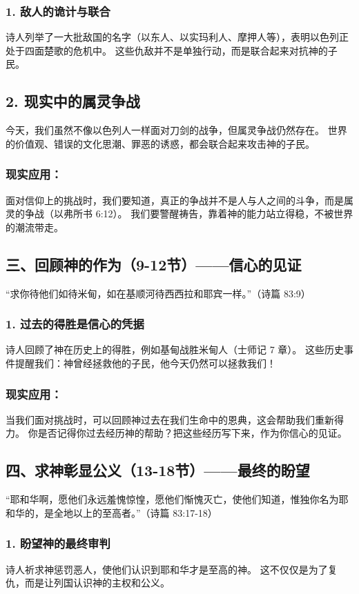 \documentclass[a4paper, 12pt]{article}
\begin{document}
\subsubsection*{1. 敌人的诡计与联合}
诗人列举了一大批敌国的名字（以东人、以实玛利人、摩押人等），表明以色列正处于四面楚歌的危机中。
这些仇敌并不是单独行动，而是联合起来对抗神的子民。
\subsection*{2. 现实中的属灵争战}
今天，我们虽然不像以色列人一样面对刀剑的战争，但属灵争战仍然存在。
世界的价值观、错误的文化思潮、罪恶的诱惑，都会联合起来攻击神的子民。
\subsubsection*{现实应用：}

面对信仰上的挑战时，我们要知道，真正的争战并不是人与人之间的斗争，而是属灵的争战（以弗所书 6:12）。
我们要警醒祷告，靠着神的能力站立得稳，不被世界的潮流带走。
\subsection*{三、回顾神的作为（9-12节）——信心的见证}
“求你待他们如待米甸，如在基顺河待西西拉和耶宾一样。”（诗篇 83:9）

\subsubsection*{1. 过去的得胜是信心的凭据}
诗人回顾了神在历史上的得胜，例如基甸战胜米甸人（士师记 7 章）。
这些历史事件提醒我们：神曾经拯救他的子民，他今天仍然可以拯救我们！
\subsubsection*{现实应用：}

当我们面对挑战时，可以回顾神过去在我们生命中的恩典，这会帮助我们重新得力。
你是否记得你过去经历神的帮助？把这些经历写下来，作为你信心的见证。
\subsection*{四、求神彰显公义（13-18节）——最终的盼望}
“耶和华啊，愿他们永远羞愧惊惶，愿他们惭愧灭亡，使他们知道，惟独你名为耶和华的，是全地以上的至高者。”（诗篇 83:17-18）

\subsubsection*{1. 盼望神的最终审判}
诗人祈求神惩罚恶人，使他们认识到耶和华才是至高的神。
这不仅仅是为了复仇，而是让列国认识神的主权和公义。
\end{document}
